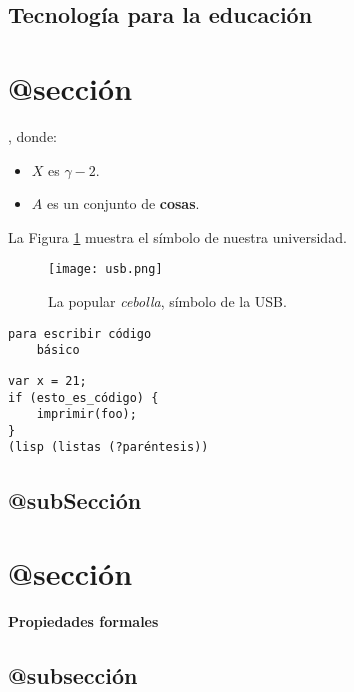 \subsection{Tecnología para la educación}


\section{@sección}
\begin{definition}
\label{definicion1}
\blindtext, donde:
\begin{itemize}
\item $X$ es $\gamma - 2$.
\item $A$ es un conjunto de \textbf{cosas}.
\end{itemize}
\end{definition}

La Figura \ref{usb} muestra el símbolo de nuestra universidad.
\begin{figure}[h!]
\centering
\texttt{[image: usb.png]}
\caption[La popular \textit{cebolla}]{La popular \textit{cebolla}, símbolo de la USB.}
\label{usb}
\end{figure}

\begin{verbatim}
para escribir código
    básico
\end{verbatim}
\Blindtext

\begin{Verbatim}[commandchars=\\\{\}, codes={\catcode`$=3\catcode`^=7}]
var x = 21;
if (esto_es_código) {
    imprimir(foo);
}
(lisp (listas (?paréntesis))
\end{Verbatim}

\blindtext
\subsection{@subSección}
\Blindtext

\section{@sección}
\blindtext

\begin{mdframed}
\begin{theorem}
\label{principal}
\textbf{Propiedades formales}
\blindenumerate
\end{theorem}
\end{mdframed}

\subsection{@subsección}
